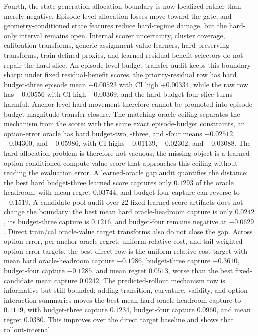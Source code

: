 Fourth, the state-generation allocation boundary is now localized rather than
merely negative.  Episode-level allocation losses move toward the gate, and
geometry-conditioned state features reduce hard-regime damage, but the
hard-only interval remains open.  Internal scorer uncertainty, cluster
coverage, calibration transforms, generic assignment-value learners,
hard-preserving transforms, train-defined proxies, and learned residual-benefit
selectors do not repair the hard slice.  An episode-level budget-transfer audit
keeps this boundary sharp: under fixed residual-benefit scores, the
priority-residual row has hard budget-three episode mean $-0.00523$ with CI high
$+0.00334$, while the raw row has $-0.00556$ with CI high $+0.00369$, and the
hard budget-four slice turns harmful.  Anchor-level hard movement therefore
cannot be promoted into episode budget-magnitude transfer closure.  The matching
oracle ceiling separates the mechanism from the score: with the same exact
episode-budget constraints, an option-error oracle has hard budget-two, -three,
and -four means $-0.02512$, $-0.04300$, and $-0.05986$, with CI highs
$-0.01139$, $-0.02302$, and $-0.03088$.  The hard allocation problem is
therefore not vacuous; the missing object is a learned option-conditioned
compute-value score that approaches this ceiling without reading the evaluation
error.  A learned-oracle gap audit quantifies the distance: the best hard
budget-three learned score captures only $0.1293$ of the oracle headroom, with
mean regret $0.03744$, and budget-four capture can reverse to $-0.1519$.  A
candidate-pool audit over $22$ fixed learned score artifacts does not change the
boundary: the best mean hard oracle-headroom capture is only $0.0242$, its
budget-three capture is $0.1216$, and budget-four remains negative at
$-0.0629$.  Direct train/cal oracle-value target transforms also do not close
the gap.  Across option-error, per-anchor oracle-regret, uniform-relative-cost,
and tail-weighted option-error targets, the best direct row is the
uniform-relative-cost target with mean hard oracle-headroom capture $-0.1986$,
budget-three capture $-0.3610$, budget-four capture $-0.1285$, and mean regret
$0.0513$, worse than the best fixed-candidate mean capture $0.0242$.  The
predicted-rollout mechanism row is informative but still bounded: adding
transition, curvature, validity, and option-interaction summaries moves the
best mean hard oracle-headroom capture to $0.1119$, with budget-three capture
$0.1234$, budget-four capture $0.0960$, and mean regret $0.0380$.  This
improves over the direct target baseline and shows that rollout-internal
